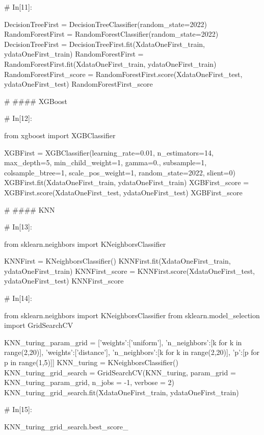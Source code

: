 \documentclass{MathorCupmodeling}
\begin{document}
\begin{python}
# In[11]:


DecisionTreeFirst = DecisionTreeClassifier(random_state=2022)
RandomForestFirst = RandomForestClassifier(random_state=2022)
DecisionTreeFirst = DecisionTreeFirst.fit(XdataOneFirst_train, ydataOneFirst_train)
RandomForestFirst = RandomForestFirst.fit(XdataOneFirst_train, ydataOneFirst_train)
RandomForestFirst_score = RandomForestFirst.score(XdataOneFirst_test, ydataOneFirst_test)
RandomForestFirst_score


# #### XGBoost

# In[12]:


from xgboost import XGBClassifier

XGBFirst = XGBClassifier(learning_rate=0.01,
                         n_estimators=14,
                         max_depth=5,
                         min_child_weight=1,
                         gamma=0.,
                         subsample=1,
                         colsample_btree=1,
                         scale_pos_weight=1,
                         random_state=2022,
                         slient=0)
XGBFirst.fit(XdataOneFirst_train, ydataOneFirst_train)
XGBFirst_score = XGBFirst.score(XdataOneFirst_test, ydataOneFirst_test)
XGBFirst_score


# #### KNN

# In[13]:


from sklearn.neighbors import KNeighborsClassifier

KNNFirst = KNeighborsClassifier()
KNNFirst.fit(XdataOneFirst_train, ydataOneFirst_train)
KNNFirst_score = KNNFirst.score(XdataOneFirst_test, ydataOneFirst_test)
KNNFirst_score


# In[14]:


from sklearn.neighbors import KNeighborsClassifier
from sklearn.model_selection import GridSearchCV

KNN_turing_param_grid = [{'weights':['uniform'],
                          'n_neighbors':[k for k in range(2,20)]},
                         {'weights':['distance'],
                          'n_neighbors':[k for k in range(2,20)],
                          'p':[p for p in range(1,5)]}]
KNN_turing = KNeighborsClassifier()
KNN_turing_grid_search = GridSearchCV(KNN_turing,
                                      param_grid = KNN_turing_param_grid,
                                      n_jobs = -1,
                                      verbose = 2)
KNN_turing_grid_search.fit(XdataOneFirst_train, ydataOneFirst_train)


# In[15]:


KNN_turing_grid_search.best_score_



\end{python}
\end{document}
